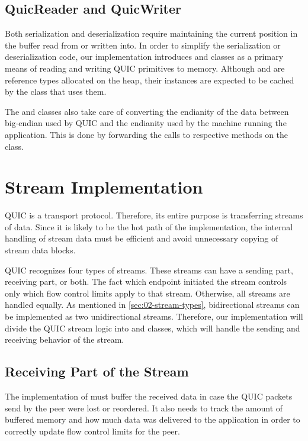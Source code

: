 \subsection{QuicReader and QuicWriter}

Both serialization and deserialization require maintaining the current position in the buffer read
from or written into. In order to simplify the serialization or deserialization code, our
implementation introduces \QuicReader{} and \QuicWriter{} classes as a primary means of reading and
writing QUIC primitives to memory. Although \QuicReader{} and \QuicWriter{} are reference types
allocated on the heap, their instances are expected to be cached by the class that uses them.

The \QuicReader{} and \QuicWriter{} classes also take care of converting the endianity of the data
between big-endian used by QUIC and the endianity used by the machine running the application. This
is done by forwarding the calls to respective methods on the  class.

\section{Stream Implementation}\label{sec:03-stream-implementation}

QUIC is a transport protocol. Therefore, its entire purpose is transferring streams of data. Since
it is likely to be the hot path of the implementation, the internal handling of stream data must be
efficient and avoid unnecessary copying of stream data blocks.

QUIC recognizes four types of streams. These streams can have a sending part, receiving part, or
both. The fact which endpoint initiated the stream controls only which flow control limits apply to
that stream. Otherwise, all streams are handled equally. As mentioned in
\autoref{sec:02-stream-types}, bidirectional streams can be implemented as two unidirectional
streams. Therefore, our implementation will divide the QUIC stream logic into \SendStream{} and
\ReceiveStream{} classes, which will handle the sending and receiving behavior of the stream.

\subsection{Receiving Part of the Stream}\label{sec:03-receive-stream}

The implementation of \ReceiveStream{} must buffer the received data in case the QUIC packets send
by the peer were lost or reordered. It also needs to track the amount of buffered memory and how
much data was delivered to the application in order to correctly update flow control limits for the
peer.

